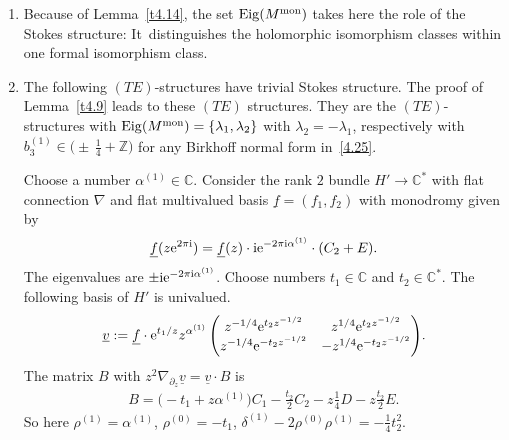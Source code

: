 \documentclass[10pt,a4paper]{amsart}
\numberwithin{equation}{section}
\numberwithin{figure}{section}
\newcommand{\Z}{{\mathbb Z}}
\newcommand{\C}{{\mathbb C}}
\newcommand{\uuuu}{\underline}
\newcommand{\paa}{\partial}
\newcommand{\nnn}{\nabla}
\DeclareMathOperator{\Eig}{Eig}
\begin{document}
\begin{Remarks}\qquad%
\begin{enumerate}\itemsep=0pt
\item[$(i)$] Because of Lemma~\ref{t4.14}, the set $\Eig(M^{\rm mon})$
takes here the role of the Stokes structure: It~distinguishes the
holomorphic isomorphism classes within one formal
isomorphism class.

\item[$(ii)$] The following $(TE)$-structures
have trivial Stokes structure.
The proof of Lemma~\ref{t4.9} leads to these $(TE)$ structures. They are the $(TE)$-structures
with $\Eig(M^{\rm mon})=\{\lambda_1,\lambda_2\}$
with $\lambda_2=-\lambda_1$,
respectively with $b_3^{(1)}\in\big({\pm}\,\frac{1}{4}+\Z\big)$
for any Birkhoff normal form in~\eqref{4.25}.

Choose a number $\alpha^{(1)}\in\C$.
Consider the rank $2$ bundle $H'\to\C^*$ with flat
connection $\nnn$ and flat multivalued basis
$\uuuu{f}=(f_1,f_2)$ with monodromy given by
\begin{gather*}%
\uuuu{f}(z{\rm e}^{2\pi {\rm i}})=\uuuu{f}(z)\cdot {\rm i}{\rm e}^{-2\pi {\rm i}\alpha^{(1)}}
\cdot (C_2+E).
\end{gather*}
The eigenvalues are $\pm {\rm i}{\rm e}^{-2\pi {\rm i}\alpha^{(1)}}$.
Choose numbers $t_1\in\C$ and $t_2\in\C^*$.
The following basis of $H'$ is univalued.
\begin{eqnarray}\label{4.43}
\uuuu{v}:= \uuuu{f}\cdot {\rm e}^{t_1/z}z^{\alpha^{(1)}}
\begin{pmatrix}z^{-1/4}{\rm e}^{t_2z^{-1/2}}
& z^{1/4}{\rm e}^{t_2z^{-1/2}}\\
z^{-1/4}{\rm e}^{-t_2z^{-1/2}}
&-z^{1/4}{\rm e}^{-t_2z^{-1/2}}
\end{pmatrix}\!.
\end{eqnarray}
The matrix $B$ with
$z^2\nnn_{\paa_z}\uuuu{v}=\uuuu{v}\cdot B$ is
\begin{gather}\label{4.44}
B= \big({-}t_1+z\alpha^{(1)}\big)C_1-\frac{t_2}{2} C_2
-z\frac{1}{4}D-z\frac{t_2}{2}E.
\end{gather}
So here $\rho^{(1)}=\alpha^{(1)}$, $\rho^{(0)}=-t_1$,
$\delta^{(1)}-2\rho^{(0)}\rho^{(1)}=-\frac{1}{4}t_2^2$.


\end{enumerate}
\end{Remarks}
\end{document}
